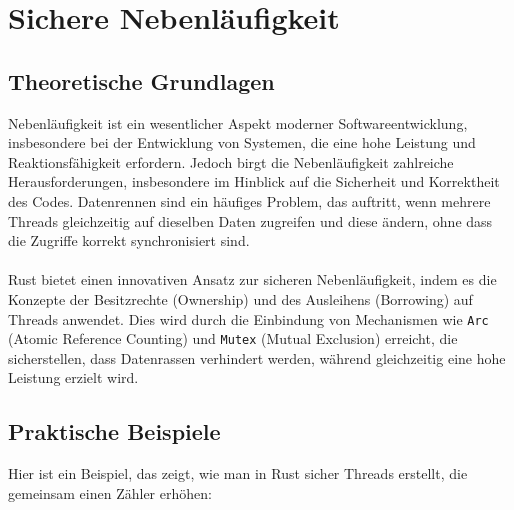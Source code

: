 \chapter{Sichere Nebenläufigkeit}

\section{Theoretische Grundlagen}

Nebenläufigkeit ist ein wesentlicher Aspekt moderner Softwareentwicklung, insbesondere bei der Entwicklung von Systemen, die eine hohe Leistung und Reaktionsfähigkeit erfordern. 
Jedoch birgt die Nebenläufigkeit zahlreiche Herausforderungen, insbesondere im Hinblick auf die Sicherheit und Korrektheit des Codes.
Datenrennen sind ein häufiges Problem, das auftritt, wenn mehrere Threads gleichzeitig auf dieselben Daten zugreifen und diese ändern, ohne dass die Zugriffe korrekt synchronisiert sind.\\ 
\\
Rust bietet einen innovativen Ansatz zur sicheren Nebenläufigkeit, indem es die Konzepte der Besitzrechte (Ownership) und des Ausleihens (Borrowing) auf Threads anwendet. 
Dies wird durch die Einbindung von Mechanismen wie \texttt{Arc} (Atomic Reference Counting) und \texttt{Mutex} (Mutual Exclusion) erreicht, die sicherstellen, dass Datenrassen verhindert werden, während gleichzeitig eine hohe Leistung erzielt wird.

\section{Praktische Beispiele}

Hier ist ein Beispiel, das zeigt, wie man in Rust sicher Threads erstellt, die gemeinsam einen Zähler erhöhen:

